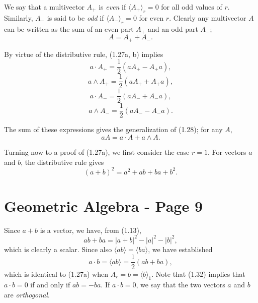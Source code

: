 \documentclass[fleqn]{scrartcl}
\numberwithin{equation}{section}
\begin{document}
\vspace{1em}
\noindent We say that a multivector \(A_+\) is \textit{even} if \(\langle A_+ \rangle_r = 0\) for all odd values of \(r\). Similarly, \(A_-\) is said to be \textit{odd} if \(\langle A_- \rangle_r = 0\) for even \(r\). Clearly any multivector \(A\) can be written as the sum of an even part \(A_+\) and an odd part \(A_-\);
\begin{equation}
A = A_+ + A_-. \tag{1.29}
\end{equation}

\noindent By virtue of the distributive rule, (1.27a, b) implies
\begin{equation}
a \cdot A_+ = \frac{1}{2}(a A_+ - A_+ a), \tag{1.30a}
\end{equation}
\begin{equation}
a \wedge A_+ = \frac{1}{2}(a A_+ + A_+ a), \tag{1.30b}
\end{equation}
\begin{equation}
a \cdot A_- = \frac{1}{2}(a A_- + A_- a), \tag{1.30c}
\end{equation}
\begin{equation}
a \wedge A_- = \frac{1}{2}(a A_- - A_- a). \tag{1.30d}
\end{equation}

\noindent The sum of these expressions gives the generalization of (1.28); for any \(A\),
\begin{equation}
a A = a \cdot A + a \wedge A. \tag{1.31}
\end{equation}

\vspace{1em}
\noindent Turning now to a proof of (1.27a), we first consider the case \(r = 1\). For vectors \(a\) and \(b\), the distributive rule gives
\[
(a+b)^2 = a^2 + ab + ba + b^2.
\]

\section*{Geometric Algebra - Page 9}

\noindent Since \(a + b\) is a vector, we have, from (1.13),
\[
ab + ba = |a+b|^2 - |a|^2 - |b|^2,
\]
which is clearly a scalar. Since also \(\langle ab \rangle = \langle ba \rangle\), we have established
\begin{equation}
a \cdot b = \langle ab \rangle = \frac{1}{2}(ab + ba), \tag{1.32}
\end{equation}
which is identical to (1.27a) when \(A_r = b = \langle b \rangle_1\). Note that (1.32) implies that \(a \cdot b = 0\) if and only if \(ab = -ba\). If \(a \cdot b = 0\), we say that the two vectors \(a\) and \(b\) are \textit{orthogonal}.
\end{document}
